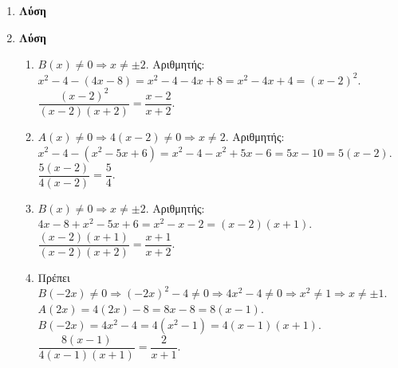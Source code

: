 \documentclass[11pt,a4paper,modern]{FFExercises}
\begin{document}
\begin{enumerate}[resume]
\item \textbf{Λύση}

\item \textbf{Λύση}
\begin{enumerate}
\item $B(x) \neq 0 \Rightarrow x \neq \pm 2$.
Αριθμητής: $x^2-4 - (4x-8) = x^2-4-4x+8 = x^2-4x+4 = (x-2)^2$.
$\dfrac{(x-2)^2}{(x-2)(x+2)} = \dfrac{x-2}{x+2}$.
\item $A(x) \neq 0 \Rightarrow 4(x-2) \neq 0 \Rightarrow x \neq 2$.
Αριθμητής: $x^2-4 - (x^2-5x+6) = x^2-4-x^2+5x-6 = 5x-10 = 5(x-2)$.
$\dfrac{5(x-2)}{4(x-2)} = \dfrac{5}{4}$.
\item $B(x) \neq 0 \Rightarrow x \neq \pm 2$.
Αριθμητής: $4x-8 + x^2-5x+6 = x^2-x-2 = (x-2)(x+1)$.
$\dfrac{(x-2)(x+1)}{(x-2)(x+2)} = \dfrac{x+1}{x+2}$.
\item Πρέπει $B(-2x) \neq 0 \Rightarrow (-2x)^2-4 \neq 0 \Rightarrow 4x^2-4 \neq 0 \Rightarrow x^2 \neq 1 \Rightarrow x \neq \pm 1$.
$A(2x) = 4(2x)-8 = 8x-8 = 8(x-1)$.
$B(-2x) = 4x^2-4 = 4(x^2-1) = 4(x-1)(x+1)$.
$\dfrac{8(x-1)}{4(x-1)(x+1)} = \dfrac{2}{x+1}$.
\end{enumerate}

\end{enumerate}
\end{document}

